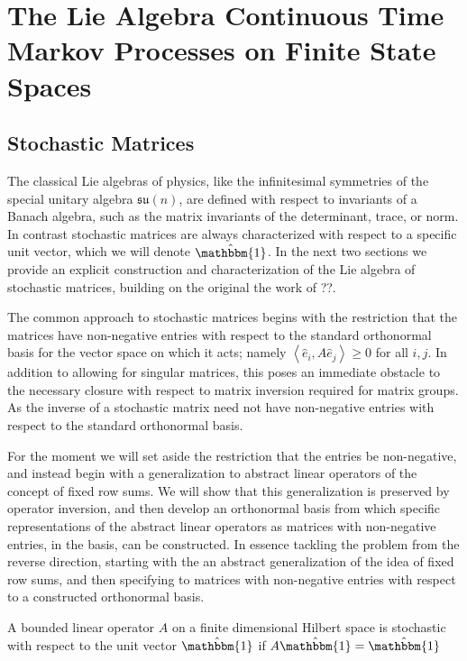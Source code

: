 \chapter{The Lie Algebra Continuous Time Markov Processes on Finite State Spaces}
\section{Stochastic Matrices}
The classical Lie algebras of physics, like the infinitesimal symmetries
of the special unitary algebra $\mathfrak{su}(n)$, are defined with respect to
invariants of a Banach algebra, such as the matrix invariants of the 
determinant, trace, or norm. In contrast stochastic matrices are always 
characterized with respect to a specific unit vector, which we will denote 
$\hat{\mathbbm{1}}$. In the next two sections we provide an explicit 
construction and characterization of the Lie algebra of stochastic matrices, 
building on the original the work of ??.

The common approach to stochastic matrices begins with the restriction that the 
matrices have non-negative entries with respect to the standard orthonormal 
basis for the vector space on which it acts; namely $\left\langle\hat{e}_i,A \hat{e}_j\right\rangle \ge 0$
for all $i,j$. In addition to allowing for singular matrices, this poses an 
immediate obstacle to the necessary closure with respect to matrix inversion 
required for matrix groups. As the inverse of a stochastic matrix need not have 
non-negative entries with respect to the standard orthonormal basis. 

For the moment we will set aside the restriction that the entries be 
non-negative, and instead begin with a generalization to abstract linear 
operators of the concept of fixed row sums. We will show that this 
generalization is preserved by operator inversion, and then develop an 
orthonormal basis from which specific representations of the abstract linear 
operators as matrices with non-negative entries, in the basis, can be 
constructed. In essence tackling the problem from the reverse direction, 
starting with the an abstract generalization of the idea of fixed row sums, and 
then specifying to matrices with non-negative entries with respect to a 
constructed orthonormal basis.

\begin{definition}
	A bounded linear operator $A$ on a finite dimensional Hilbert space is 
	stochastic with respect to the unit vector $\hat{\mathbbm{1}}$ if $A \hat{\mathbbm{1}} = \hat{\mathbbm{1}}$
\end{definition}

